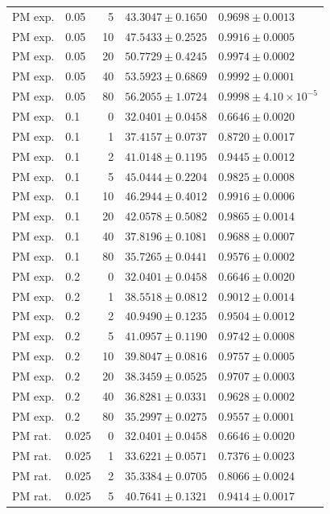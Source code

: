 \begin{longtable}{llrll}
PM exp. & 0.05 & 5 & $43.3047 \pm 0.1650$ & $0.9698 \pm 0.0013$ \\
PM exp. & 0.05 & 10 & $47.5433 \pm 0.2525$ & $0.9916 \pm 0.0005$ \\
PM exp. & 0.05 & 20 & $50.7729 \pm 0.4245$ & $0.9974 \pm 0.0002$ \\
PM exp. & 0.05 & 40 & $53.5923 \pm 0.6869$ & $0.9992 \pm 0.0001$ \\
PM exp. & 0.05 & 80 & $56.2055 \pm 1.0724$ & $0.9998 \pm 4.10\times10^{-5}$ \\
PM exp. & 0.1 & 0 & $32.0401 \pm 0.0458$ & $0.6646 \pm 0.0020$ \\
PM exp. & 0.1 & 1 & $37.4157 \pm 0.0737$ & $0.8720 \pm 0.0017$ \\
PM exp. & 0.1 & 2 & $41.0148 \pm 0.1195$ & $0.9445 \pm 0.0012$ \\
PM exp. & 0.1 & 5 & $45.0444 \pm 0.2204$ & $0.9825 \pm 0.0008$ \\
PM exp. & 0.1 & 10 & $46.2944 \pm 0.4012$ & $0.9916 \pm 0.0006$ \\
PM exp. & 0.1 & 20 & $42.0578 \pm 0.5082$ & $0.9865 \pm 0.0014$ \\
PM exp. & 0.1 & 40 & $37.8196 \pm 0.1081$ & $0.9688 \pm 0.0007$ \\
PM exp. & 0.1 & 80 & $35.7265 \pm 0.0441$ & $0.9576 \pm 0.0002$ \\
PM exp. & 0.2 & 0 & $32.0401 \pm 0.0458$ & $0.6646 \pm 0.0020$ \\
PM exp. & 0.2 & 1 & $38.5518 \pm 0.0812$ & $0.9012 \pm 0.0014$ \\
PM exp. & 0.2 & 2 & $40.9490 \pm 0.1235$ & $0.9504 \pm 0.0012$ \\
PM exp. & 0.2 & 5 & $41.0957 \pm 0.1190$ & $0.9742 \pm 0.0008$ \\
PM exp. & 0.2 & 10 & $39.8047 \pm 0.0816$ & $0.9757 \pm 0.0005$ \\
PM exp. & 0.2 & 20 & $38.3459 \pm 0.0525$ & $0.9707 \pm 0.0003$ \\
PM exp. & 0.2 & 40 & $36.8281 \pm 0.0331$ & $0.9628 \pm 0.0002$ \\
PM exp. & 0.2 & 80 & $35.2997 \pm 0.0275$ & $0.9557 \pm 0.0001$ \\
PM rat. & 0.025 & 0 & $32.0401 \pm 0.0458$ & $0.6646 \pm 0.0020$ \\
PM rat. & 0.025 & 1 & $33.6221 \pm 0.0571$ & $0.7376 \pm 0.0023$ \\
PM rat. & 0.025 & 2 & $35.3384 \pm 0.0705$ & $0.8066 \pm 0.0024$ \\
PM rat. & 0.025 & 5 & $40.7641 \pm 0.1321$ & $0.9414 \pm 0.0017$ \\

\end{longtable}
